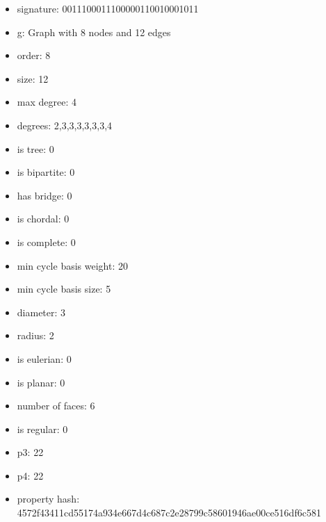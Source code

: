 \begin{itemize}
\item signature: 0011100011100000110010001011
\item g: Graph with 8 nodes and 12 edges
\item order: 8
\item size: 12
\item max degree: 4
\item degrees: 2,3,3,3,3,3,3,4
\item is tree: 0
\item is bipartite: 0
\item has bridge: 0
\item is chordal: 0
\item is complete: 0
\item min cycle basis weight: 20
\item min cycle basis size: 5
\item diameter: 3
\item radius: 2
\item is eulerian: 0
\item is planar: 0
\item number of faces: 6
\item is regular: 0
\item p3: 22
\item p4: 22
\item property hash: 4572f43411cd55174a934e667d4c687c2e28799c58601946ae00ce516df6c581
\end{itemize}
\newpage
\begin{figure}
\end{figure}
